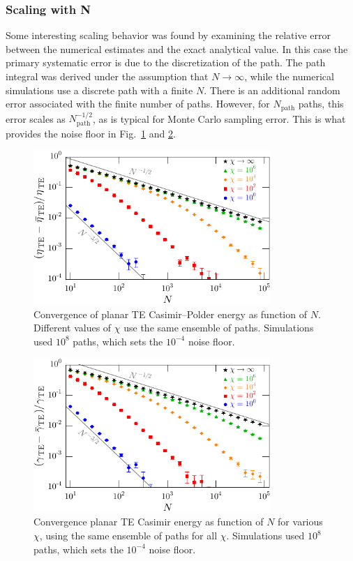 \subsubsection{Scaling with N}
\label{sec:TE_convergence}
Some interesting scaling behavior was found by examining the relative error between the numerical 
estimates and the exact analytical value.  
In this case the primary systematic error is due to the discretization of the path.
The path integral was derived under the assumption that $N\rightarrow\infty$, while the numerical
simulations use a discrete path with a finite $N$.  
There is an additional random error associated with the finite number of paths.   However, for $N_{\text{path}}$ paths,
this error scales as $N_{\text{path}}^{-1/2}$, as is typical for Monte Carlo sampling error.  This is what provides
the noise floor in Fig.~\ref{fig:conv_atom} and \ref{fig:conv_wall}.

\begin{figure}
  \centering
  \includegraphics[width=0.8\textwidth]{fig/temp/conv_TEatomN3}
  \caption[Convergence of planar TE Casimir--Polder energy  as function of $N$.  ]{
    Convergence of planar TE Casimir--Polder energy as function of $N$.  
    Different values of $\chi$ use the same ensemble of paths.
    Simulations used $10^8$ paths, which sets the $10^{-4}$ noise floor.}
  \label{fig:conv_atom}
\end{figure}

\begin{figure}
  \centering
  \includegraphics[width=0.8\textwidth]{fig/temp/conv_TE2wallN3}
  \caption[Convergence planar TE Casimir energy as function of $N$ for various $\chi$.]{
    Convergence planar TE Casimir energy as function of $N$ for various $\chi$, using the same ensemble of paths for all $\chi$.
    Simulations used $10^8$ paths, which sets the $10^{-4}$ noise floor.}
  \label{fig:conv_wall}
\end{figure}

